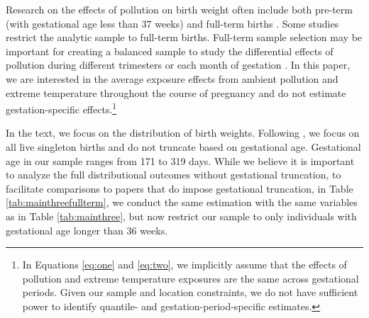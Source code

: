 Research on the effects of pollution on birth weight often include both pre-term (with gestational age less than 37 weeks) and full-term births \autocite{stieb_ambient_2012, klepac_ambient_2018}. Some studies restrict the analytic sample to full-term births. Full-term sample selection may be important for creating a balanced sample to study the differential effects of pollution during different trimesters \autocite{morello-frosch_ambient_2010} or each month of gestation \autocite{huang_periconceptional_2020}. In this paper, we are interested in the average exposure effects from ambient pollution and extreme temperature throughout the course of pregnancy and do not estimate gestation-specific effects.\footnote{In Equations \eqref{eq:one} and \eqref{eq:two}, we implicitly assume that the effects of pollution and extreme temperature exposures are the same across gestational periods. Given our sample and location constraints, we do not have sufficient power to identify quantile- and gestation-period-specific estimates.} 

In the text, we focus on the distribution of birth weights. Following \textcite{abrevaya_effects_2001, koenker_quantile_2001, firpo_unconditional_2009}, we focus on all live singleton births and do not truncate based on gestational age. Gestational age in our sample ranges from 171 to 319 days. While we believe it is important to analyze the full distributional outcomes without gestational truncation, to facilitate comparisons to papers that do impose gestational truncation, in Table \ref{tab:mainthreefullterm}, we conduct the same estimation with the same variables as in Table \ref{tab:mainthree}, but now restrict our sample to only individuals with gestational age longer than 36 weeks. 

